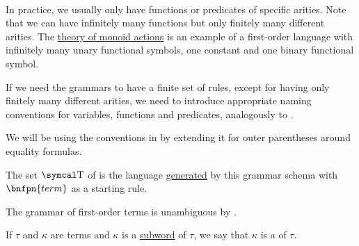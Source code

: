 \begin{definition}
\begin{DefEnum}
\begin{bnf*}
      \bnfmore                  {\hspace{3cm} \vdots} \\
       \\
      \bnfmore                  {\hspace{3cm} \vdots} \\
               { \bnfor} \\
       \\
       \\
    \end{bnf*}

    In practice, we usually only have functions or predicates of specific arities. Note that we can have infinitely many functions but only finitely many different arities. The \hyperref[rem:theory_of_left_monoid_actions]{theory of monoid actions} is an example of a first-order language with infinitely many unary functional symbols, one constant and one binary functional symbol.

    If we need the grammars to have a finite set of rules, except for having only finitely many different arities, we need to introduce appropriate naming conventions for variables, functions and predicates, analogously to .

    We will be using the conventions in  by extending it for outer parentheses around equality formulas.

    The set \( \CT \) of  is the language \hyperref[def:grammar_derivation/grammar_language]{generated} by this grammar schema with \( \bnfpn{term} \) as a starting rule.

    The grammar of first-order terms is unambiguous by .

     If \( \tau \) and \( \kappa \) are terms and \( \kappa \) is a \hyperref[def:language/subword]{subword} of \( \tau \), we say that \( \kappa \) is a  of \( \tau \).


\end{DefEnum}
\end{definition}
